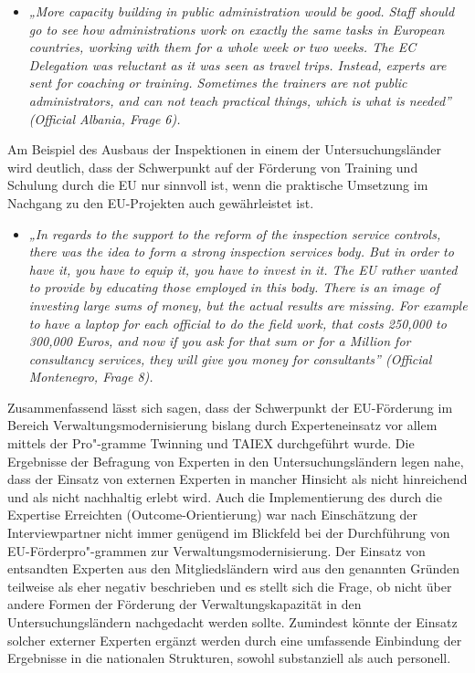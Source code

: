 \begin{itemize}[label={}]
\item \textit{„More capacity building in public administration would be good. Staff should go to see how administrations work on exactly the same tasks in European countries, working with them for a whole week or two weeks. The EC Delegation was reluctant as it was seen as travel trips. Instead, experts are sent for coaching or training. Sometimes the trainers are not public administrators, and can not teach practical things, which is what is needed” (Official Albania, Frage 6).}
\end{itemize}
Am Beispiel des Ausbaus der Inspektionen in einem der Untersuchungsländer wird deutlich, dass der Schwerpunkt auf der Förderung von Training und Schulung durch die EU nur sinnvoll ist, wenn die praktische Umsetzung im Nachgang zu den EU-Projekten auch gewährleistet ist.
\begin{itemize}[label={}]
\item \textit{„In regards to the support to the reform of the inspection service controls, there was the idea to form a strong inspection services body. But in order to have it, you have to equip it, you have to invest in it. The EU rather wanted to provide by educating those employed in this body. There is an image of investing large sums of money, but the actual results are missing. For example to have a laptop for each official to do the field work, that costs 250,000 to 300,000 Euros, and now if you ask for that sum or for a Million for consultancy services, they will give you money for consultants” (Official Montenegro, Frage 8).}
\end{itemize}
Zusammenfassend lässt sich sagen, dass der Schwerpunkt der EU-Förderung im Bereich Verwaltungsmodernisierung bislang durch Experteneinsatz vor allem mittels der Pro"-gramme Twinning und TAIEX durchgeführt wurde. Die Ergebnisse der Befragung von Experten in den Untersuchungsländern legen nahe, dass der Einsatz von externen Experten in mancher Hinsicht als nicht hinreichend und als nicht nachhaltig erlebt wird. Auch die Implementierung des durch die Expertise Erreichten (Outcome-Orientierung) war nach Einschätzung der Interviewpartner nicht immer genügend im Blickfeld bei der Durchführung von EU-Förderpro"-grammen zur Verwaltungsmodernisierung. Der Einsatz von entsandten Experten aus den Mitgliedsländern wird aus den genannten Gründen teilweise als eher negativ beschrieben und es stellt sich die Frage, ob nicht über andere Formen der Förderung der Verwaltungskapazität in den Untersuchungsländern nachgedacht werden sollte. Zumindest könnte der Einsatz solcher externer Experten ergänzt werden durch eine umfassende Einbindung der Ergebnisse in die nationalen Strukturen, sowohl substanziell als auch personell. \par
